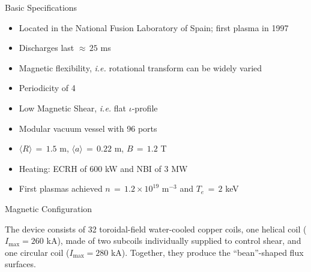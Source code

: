 \documentclass{beamer}
\newlength{\sepwiddouble}
\newlength{\onecolwid}
\begin{document}
\begin{frame}[t]
\begin{columns}[t]


\begin{column}{\onecolwid}

\begin{alertblock}{Basic Specifications}
\begin{itemize}
	\item Located in the National Fusion Laboratory of Spain; first plasma in 1997
	\item Discharges last $\approx\,25$ ms \cite{tj-ii_nodate}
	\item Magnetic flexibility, \emph{i.e.} rotational transform can be widely varied \cite{ascasibar_overview_2001}
	\item Periodicity of 4
	\item Low Magnetic Shear, \emph{i.e.} flat $\iota$-profile \cite{alejaldre_first_1999}
	\item Modular vacuum vessel with 96 ports \cite{tj-ii_nodate}
	\item $\langle R \rangle \,=\, 1.5$ m, $\langle a \rangle \,=\, 0.22$ m, $B \,=\, 1.2$ T
	\item Heating: ECRH of 600 kW and NBI of 3 MW \cite{ascasibar_overview_2001}
	\item First plasmas achieved $n \,=\, 1.2\times 10^{19}$ m$^{-3}$ and $T_e \,=\, 2$ keV \cite{alejaldre_first_1999}
\end{itemize}
\end{alertblock}

\begin{block}{Magnetic Configuration}

\hspace{32pt} The device consists of 32 toroidal-field water-cooled copper coils, one helical coil ($I_\text{max} = 260$ kA), made of two subcoils individually supplied to control shear, and one circular coil ($I_\text{max} = 280$ kA). Together, they produce the ``bean''-shaped flux surfaces.


\end{block}
\end{column}
\end{columns}
\end{frame}
\end{document}
